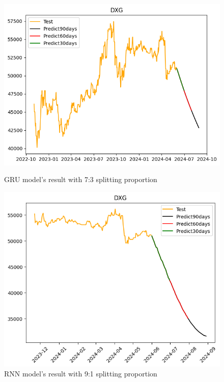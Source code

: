 \documentclass{ieeeojies}
\begin{document}
\begin{figure}[H]
  \centering
  \begin{minipage}{0.23\textwidth}
  \centering
  \includegraphics[width=1\textwidth]{bibliography/Figure/GRU_7-3.png}
  \caption{GRU model's result with 7:3 splitting proportion}
  \label{fig:1}
  \end{minipage}
  \hfill
  \begin{minipage}{0.23\textwidth}
  \centering
  \includegraphics[width=1\textwidth]{bibliography/Figure/RNN_9-1.png}
  \caption{RNN model's result with 9:1 splitting proportion}
  \label{fig:2}
  \end{minipage}
\end{figure}
\end{document}
